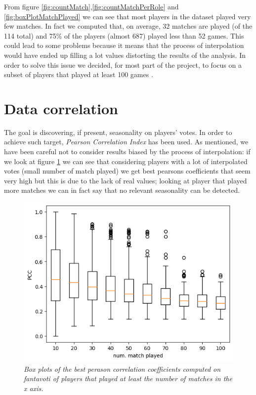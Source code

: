 From figure \ref{fig:countMatch},\ref{fig:countMatchPerRole} and \ref{fig:boxPlotMatchPlayed} we can see that most players in the dataset played very few matches. In fact we computed that, on average, 32 matches are played (of the 114 total) and 75\% of the players (almost 687) played less than 52 games. This could lead to some problems because it means that the process of interpolation would have ended up filling a lot values distorting the results of the analysis. In order to solve this issue we decided, for most part of the project, to focus on a subset of players that played at least 100 games .

\section{Data correlation}
The goal is discovering, if present, seasonality on players' votes. In order to achieve such target, \textit{Pearson Correlation Index} has been used.
As mentioned, we have been careful not to consider results biased by the process of interpolation: if we look at figure \ref{fig:box_plot_pearson} we can see that considering players with a lot of interpolated votes (small number of match played) we get best pearsons coefficients that seem very high but this is due to the lack of real values; looking at player that played more matches we can in fact say that no relevant seasonality can be detected.
\begin{figure}[h]
  \includegraphics[scale=0.75]{images/quantile_pcc.png}
  \centering
   \caption{\textit{Box plots of the best perason correlation coefficients computed on fantavoti of players that played at least the number of matches in the x axis.}}
  \label{fig:box_plot_pearson}
\end{figure}

